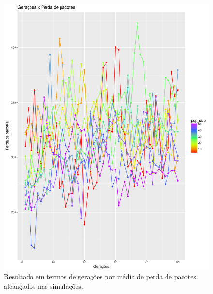 \documentclass[conference]{IEEEtran}
\begin{document}
\begin{figure}[h]
  \centering
  \includegraphics[scale=0.30]{figures/GeracoesXPerdaPacotes.pdf}
  \caption{Resultado em termos de gerações por média de perda de pacotes alcançados nas simulações.}
  \label{fig:result-perda}
\end{figure}
\end{document}

